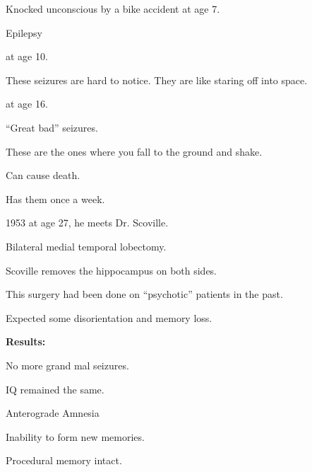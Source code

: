 \begin{coloredlist}
\begin{coloredlist}
\begin{coloredlist}
    \item Knocked unconscious by a bike accident at age 7.
    \item Epilepsy
    \begin{coloredlist}
        \item {} at age 10.
        \begin{coloredlist}
            \item These seizures are hard to notice. They are like staring off into space.
        \end{coloredlist}
        \item {} at age 16.
        \begin{coloredlist}
            \item ``Great bad'' seizures.
            \item These are the ones where you fall to the ground and shake.
            \item Can cause death.
            \item Has them once a week.
        \end{coloredlist}
    \end{coloredlist}
    \item 1953 at age 27, he meets Dr. Scoville.
    \begin{coloredlist}
        \item Bilateral medial temporal lobectomy.
        \item Scoville removes the hippocampus on both sides.
        \item This surgery had been done on ``psychotic'' patients in the past.
        \item Expected some disorientation and memory loss.
    \end{coloredlist}
    \item \textbf{Results:}
    \begin{coloredlist}
        \item No more grand mal seizures.
        \item IQ remained the same.
        \item Anterograde Amnesia
        \begin{coloredlist}
            \item Inability to form new memories.
        \end{coloredlist}
        \item Procedural memory intact.
        \begin{coloredlist}

\end{coloredlist}
\end{coloredlist}
\end{coloredlist}
\end{coloredlist}
\end{coloredlist}
